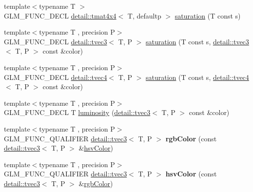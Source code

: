 \begin{DoxyCompactItemize}
\item 
{\footnotesize template$<$typename T $>$ }\\G\+L\+M\+\_\+\+F\+U\+N\+C\+\_\+\+D\+E\+CL \hyperlink{structglm_1_1detail_1_1tmat4x4}{detail\+::tmat4x4}$<$ T, defaultp $>$ \hyperlink{group__gtx__color__space_ga444bcc8582eaa894acf405762ba2a5ff}{saturation} (T const s)
\item 
{\footnotesize template$<$typename T , precision P$>$ }\\G\+L\+M\+\_\+\+F\+U\+N\+C\+\_\+\+D\+E\+CL \hyperlink{structglm_1_1detail_1_1tvec3}{detail\+::tvec3}$<$ T, P $>$ \hyperlink{group__gtx__color__space_ga1a6fe89b5effcc718b5f49de5bb50fad}{saturation} (T const s, \hyperlink{structglm_1_1detail_1_1tvec3}{detail\+::tvec3}$<$ T, P $>$ const \&color)
\item 
{\footnotesize template$<$typename T , precision P$>$ }\\G\+L\+M\+\_\+\+F\+U\+N\+C\+\_\+\+D\+E\+CL \hyperlink{structglm_1_1detail_1_1tvec4}{detail\+::tvec4}$<$ T, P $>$ \hyperlink{group__gtx__color__space_ga42cc34c45ab66e010c629106952c8bdd}{saturation} (T const s, \hyperlink{structglm_1_1detail_1_1tvec4}{detail\+::tvec4}$<$ T, P $>$ const \&color)
\item 
{\footnotesize template$<$typename T , precision P$>$ }\\G\+L\+M\+\_\+\+F\+U\+N\+C\+\_\+\+D\+E\+CL T \hyperlink{group__gtx__color__space_ga3fb6710bbbf4f3e2303b06946e9cf00c}{luminosity} (\hyperlink{structglm_1_1detail_1_1tvec3}{detail\+::tvec3}$<$ T, P $>$ const \&color)
\item 
{\footnotesize template$<$typename T , precision P$>$ }\\G\+L\+M\+\_\+\+F\+U\+N\+C\+\_\+\+Q\+U\+A\+L\+I\+F\+I\+ER \hyperlink{structglm_1_1detail_1_1tvec3}{detail\+::tvec3}$<$ T, P $>$ {\bfseries rgb\+Color} (const \hyperlink{structglm_1_1detail_1_1tvec3}{detail\+::tvec3}$<$ T, P $>$ \&\hyperlink{group__gtx__color__space_ga9d3d99c06af10403d317dec0cb655090}{hsv\+Color})\hypertarget{namespaceglm_a8c4fa9180542044924ea580989b40da9}{}\label{namespaceglm_a8c4fa9180542044924ea580989b40da9}

\item 
{\footnotesize template$<$typename T , precision P$>$ }\\G\+L\+M\+\_\+\+F\+U\+N\+C\+\_\+\+Q\+U\+A\+L\+I\+F\+I\+ER \hyperlink{structglm_1_1detail_1_1tvec3}{detail\+::tvec3}$<$ T, P $>$ {\bfseries hsv\+Color} (const \hyperlink{structglm_1_1detail_1_1tvec3}{detail\+::tvec3}$<$ T, P $>$ \&\hyperlink{group__gtx__color__space_gafe29cc37c2675aee66c9f9ae3e5e7294}{rgb\+Color})\hypertarget{namespaceglm_adf91b922842c8cd39f7009cef9ebe35e}{}\label{namespaceglm_adf91b922842c8cd39f7009cef9ebe35e}


\end{DoxyCompactItemize}
